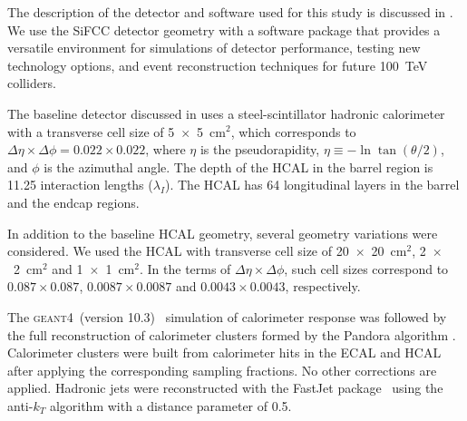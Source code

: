 \documentclass[final,1p,11pt]{elsarticle}
\newcommand{\GEANTfour} {\textsc{geant4}}
\begin{document}
The description of the detector and software used for this study is discussed in \cite{Chekanov:2016ppq}.
We use the SiFCC detector geometry with a software package that provides a versatile environment for simulations
of detector performance, testing new technology options, and event reconstruction techniques for future
100~TeV colliders.


The baseline  detector discussed in \cite{Chekanov:2016ppq}
uses a  steel-scintillator hadronic calorimeter with a transverse cell size of 5~$\times$~5~cm$^2$,
which corresponds to $\Delta \eta \times \Delta \phi = 0.022\times0.022$,
where $\eta$ is the pseudorapidity,
$\eta \equiv -\ln\tan(\theta/2)$, and $\phi$ is the azimuthal angle.
The depth of the HCAL
in the barrel region is  11.25 interaction lengths ($\lambda_I$).
The HCAL has 64 longitudinal layers in the barrel and the endcap regions.

In addition to the baseline HCAL geometry,
several geometry variations were considered.
We used the HCAL with transverse cell size of
20~$\times$~20~cm$^2$, 2~$\times$~2~cm$^2$ and  1~$\times$~1~cm$^2$.
In the terms of $\Delta \eta \times \Delta \phi$,  such cell sizes correspond to
$0.087\times0.087$, $0.0087\times 0.0087$ and  $0.0043\times0.0043$, respectively.

The \GEANTfour\ (version 10.3)~\cite{Allison2016186} simulation of calorimeter response was followed by the full reconstruction of calorimeter clusters formed by the Pandora algorithm \cite{Charles:2009ta,Marshall:2013bda}.
Calorimeter clusters were built from calorimeter hits in the  ECAL and HCAL after applying the corresponding sampling fractions. No other corrections are applied.
Hadronic jets were 
reconstructed with the {\sc FastJet} package~\cite{fastjet} using the anti-$k_T$ algorithm \cite{Cacciari:2008gp}
with  a distance parameter of 0.5. 
\end{document}
